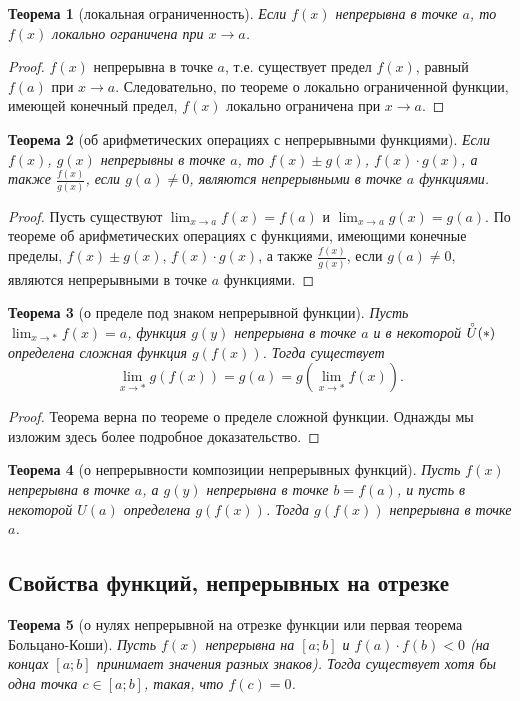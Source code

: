 \documentclass[a4paper,12pt]{article} %
\newtheorem{theorem}{Теорема}[section]
\theoremstyle{remark}
\theoremstyle{definition}
\begin{document}
\begin{theorem}[локальная ограниченность]
	Если $f(x)$ непрерывна в точке $a$, то $f(x)$ локально ограничена при $x\to a$.
\end{theorem}
\begin{proof}
    $f(x)$ непрерывна в точке $a$, т.е. существует предел $f(x)$, равный $f(a)$ при $x\to a$. Следовательно, по теореме о локально ограниченной функции, имеющей конечный предел, $f(x)$ локально ограничена при $x\to a$. 
\end{proof}

\begin{theorem}[об арифметических операциях с непрерывными функциями]
    Если $f(x)$, $g(x)$ непрерывны в точке $a$, то $f(x)\pm g(x)$, $f(x)\cdot g(x)$, а также $\frac{f(x)}{g(x)}$, если $g(a)\neq 0$, являются непрерывными в точке $a$ функциями.
\end{theorem}
\begin{proof}
    Пусть существуют $\displaystyle \lim_{x \to a} f(x) = f(a)$ и $\displaystyle \lim_{x \to a} g(x) = g(a)$. По теореме об арифметических операциях с функциями, имеющими конечные пределы, $f(x)\pm g(x)$, $f(x)\cdot g(x)$, а также $\frac{f(x)}{g(x)}$, если $g(a)\neq 0$, являются непрерывными в точке $a$ функциями.
\end{proof}

\begin{theorem}[о пределе под знаком непрерывной функции]
    Пусть $\displaystyle \lim_{x \to *} f(x) = a$, функция $g(y)$ непрерывна в точке $a$ и в некоторой $\accentset{\circ}{U}(*)$ определена сложная функция $g(f(x))$. Тогда существует
    \[\lim_{x \to *} g(f(x)) = g(a) = g(\lim_{x \to *} f(x)).\]
\end{theorem}
\begin{proof}
    Теорема верна по теореме о пределе сложной функции. Однажды мы изложим здесь более подробное доказательство.
\end{proof}

\begin{theorem}[о непрерывности композиции непрерывных функций]
    Пусть $f(x)$ непрерывна в точке $a$, а $g(y)$ непрерывна в точке $b = f(a)$, и пусть в некоторой $U(a)$ определена $g(f(x))$.
    Тогда $g(f(x))$ непрерывна в точке $a$.
\end{theorem}

\subsection{Свойства функций, непрерывных на отрезке}
\begin{theorem}[о нулях непрерывной на отрезке функции или первая теорема Больцано-Коши]
    Пусть $f(x)$ непрерывна на $[a; b]$ и $f(a)\cdot f(b) < 0$ (на концах $[a; b]$ принимает значения разных знаков).
    Тогда существует хотя бы одна точка $c\in [a; b]$, такая, что $f(c) = 0$.
\end{theorem}
\end{document}
